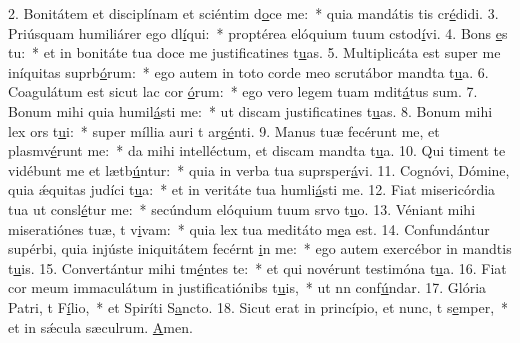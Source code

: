 2. Bonitátem et disciplínam et sciéntim d\uline{o}ce me:~* quia mandátis tis cr\uline{é}didi.
3. Priúsquam humiliárer ego dl\uline{í}qui:~* proptérea elóquium tuum cstod\uline{í}vi.
4. Bons \uline{e}s tu:~* et in bonitáte tua doce me justificatines t\uline{u}as.
5. Multiplicáta est super me iníquitas suprb\uline{ó}rum:~* ego autem in toto corde meo scrutábor mandta t\uline{u}a.
6. Coagulátum est sicut lac cor \uline{ó}rum:~* ego vero legem tuam mdit\uline{á}tus sum.
7. Bonum mihi quia humil\uline{á}sti me:~* ut discam justificatines t\uline{u}as.
8. Bonum mihi lex ors t\uline{u}i:~* super míllia auri t arg\uline{é}nti.
9. Manus tuæ fecérunt me, et plasmv\uline{é}runt me:~* da mihi intelléctum, et discam mandta t\uline{u}a.
10. Qui timent te vidébunt me et lætb\uline{ú}ntur:~* quia in verba tua suprsper\uline{á}vi.
11. Cognóvi, Dómine, quia ǽquitas judíci t\uline{u}a:~* et in veritáte tua humli\uline{á}sti me.
12. Fiat misericórdia tua ut consl\uline{é}tur me:~* secúndum elóquium tuum srvo t\uline{u}o.
13. Véniant mihi miseratiónes tuæ, t v\uline{i}vam:~* quia lex tua meditáto m\uline{e}a est.
14. Confundántur supérbi, quia injúste iniquitátem fecérnt \uline{i}n me:~* ego autem exercébor in mandtis t\uline{u}is.
15. Convertántur mihi tm\uline{é}ntes te:~* et qui novérunt testimóna t\uline{u}a.
16. Fiat cor meum immaculátum in justificatiónibs t\uline{u}is,~* ut nn conf\uline{ú}ndar.
17. Glória Patri, t F\uline{í}lio,~* et Spiríti S\uline{a}ncto.
18. Sicut erat in princípio, et nunc, t s\uline{e}mper,~* et in sǽcula sæculrum. \uline{A}men.

